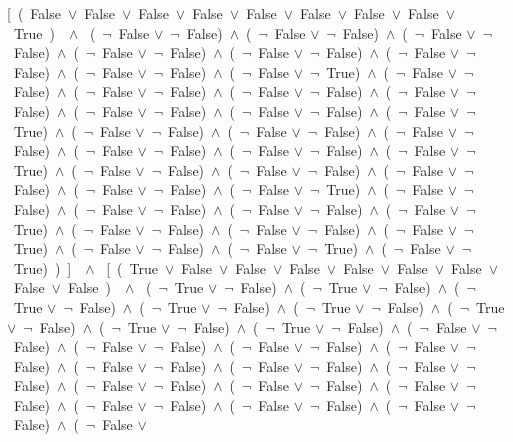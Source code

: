 ﻿\documentclass[a4paper,10pt]{article}
\begin{document}
[\ (\ False\ $\vee$\ False\ $\vee$\ False\ $\vee$\ False\ $\vee$\ False\ $\vee$\ False\ $\vee$\ False\ $\vee$\ False\ $\vee$\ True\ )\ \ $\wedge$ \ (\  $\neg$\ False $\vee$\  $\neg$\ False)\ $\wedge$\ (\  $\neg$\ False $\vee$\  $\neg$\ False)\ $\wedge$\ (\  $\neg$\ False $\vee$\  $\neg$\ False)\ $\wedge$\ (\  $\neg$\ False $\vee$\  $\neg$\ False)\ $\wedge$\ (\  $\neg$\ False $\vee$\  $\neg$\ False)\ $\wedge$\ (\  $\neg$\ False $\vee$\  $\neg$\ False)\ $\wedge$\ (\  $\neg$\ False $\vee$\  $\neg$\ False)\ $\wedge$\ (\  $\neg$\ False $\vee$\  $\neg$\ True)\ $\wedge$\ (\  $\neg$\ False $\vee$\  $\neg$\ False)\ $\wedge$\ (\  $\neg$\ False $\vee$\  $\neg$\ False)\ $\wedge$\ (\  $\neg$\ False $\vee$\  $\neg$\ False)\ $\wedge$\ (\  $\neg$\ False $\vee$\  $\neg$\ False)\ $\wedge$\ (\  $\neg$\ False $\vee$\  $\neg$\ False)\ $\wedge$\ (\  $\neg$\ False $\vee$\  $\neg$\ False)\ $\wedge$\ (\  $\neg$\ False $\vee$\  $\neg$\ True)\ $\wedge$\ (\  $\neg$\ False $\vee$\  $\neg$\ False)\ $\wedge$\ (\  $\neg$\ False $\vee$\  $\neg$\ False)\ $\wedge$\ (\  $\neg$\ False $\vee$\  $\neg$\ False)\ $\wedge$\ (\  $\neg$\ False $\vee$\  $\neg$\ False)\ $\wedge$\ (\  $\neg$\ False $\vee$\  $\neg$\ False)\ $\wedge$\ (\  $\neg$\ False $\vee$\  $\neg$\ True)\ $\wedge$\ (\  $\neg$\ False $\vee$\  $\neg$\ False)\ $\wedge$\ (\  $\neg$\ False $\vee$\  $\neg$\ False)\ $\wedge$\ (\  $\neg$\ False $\vee$\  $\neg$\ False)\ $\wedge$\ (\  $\neg$\ False $\vee$\  $\neg$\ False)\ $\wedge$\ (\  $\neg$\ False $\vee$\  $\neg$\ True)\ $\wedge$\ (\  $\neg$\ False $\vee$\  $\neg$\ False)\ $\wedge$\ (\  $\neg$\ False $\vee$\  $\neg$\ False)\ $\wedge$\ (\  $\neg$\ False $\vee$\  $\neg$\ False)\ $\wedge$\ (\  $\neg$\ False $\vee$\  $\neg$\ True)\ $\wedge$\ (\  $\neg$\ False $\vee$\  $\neg$\ False)\ $\wedge$\ (\  $\neg$\ False $\vee$\  $\neg$\ False)\ $\wedge$\ (\  $\neg$\ False $\vee$\  $\neg$\ True)\ $\wedge$\ (\  $\neg$\ False $\vee$\  $\neg$\ False)\ $\wedge$\ (\  $\neg$\ False $\vee$\  $\neg$\ True)\ $\wedge$\ (\  $\neg$\ False $\vee$\  $\neg$\ True)\ )\ ]\ \ $\wedge$ \ [\ (\ True\ $\vee$\ False\ $\vee$\ False\ $\vee$\ False\ $\vee$\ False\ $\vee$\ False\ $\vee$\ False\ $\vee$\ False\ $\vee$\ False\ )\ \ $\wedge$ \ (\  $\neg$\ True $\vee$\  $\neg$\ False)\ $\wedge$\ (\  $\neg$\ True $\vee$\  $\neg$\ False)\ $\wedge$\ (\  $\neg$\ True $\vee$\  $\neg$\ False)\ $\wedge$\ (\  $\neg$\ True $\vee$\  $\neg$\ False)\ $\wedge$\ (\  $\neg$\ True $\vee$\  $\neg$\ False)\ $\wedge$\ (\  $\neg$\ True $\vee$\  $\neg$\ False)\ $\wedge$\ (\  $\neg$\ True $\vee$\  $\neg$\ False)\ $\wedge$\ (\  $\neg$\ True $\vee$\  $\neg$\ False)\ $\wedge$\ (\  $\neg$\ False $\vee$\  $\neg$\ False)\ $\wedge$\ (\  $\neg$\ False $\vee$\  $\neg$\ False)\ $\wedge$\ (\  $\neg$\ False $\vee$\  $\neg$\ False)\ $\wedge$\ (\  $\neg$\ False $\vee$\  $\neg$\ False)\ $\wedge$\ (\  $\neg$\ False $\vee$\  $\neg$\ False)\ $\wedge$\ (\  $\neg$\ False $\vee$\  $\neg$\ False)\ $\wedge$\ (\  $\neg$\ False $\vee$\  $\neg$\ False)\ $\wedge$\ (\  $\neg$\ False $\vee$\  $\neg$\ False)\ $\wedge$\ (\  $\neg$\ False $\vee$\  $\neg$\ False)\ $\wedge$\ (\  $\neg$\ False $\vee$\  $\neg$\ False)\ $\wedge$\ (\  $\neg$\ False $\vee$\  $\neg$\ False)\ $\wedge$\ (\  $\neg$\ False $\vee$\  $\neg$\ False)\ $\wedge$\ (\  $\neg$\ False $\vee$\  $\neg$\ False)\ $\wedge$\ (\  $\neg$\ False $\vee$\ 
\end{document}
